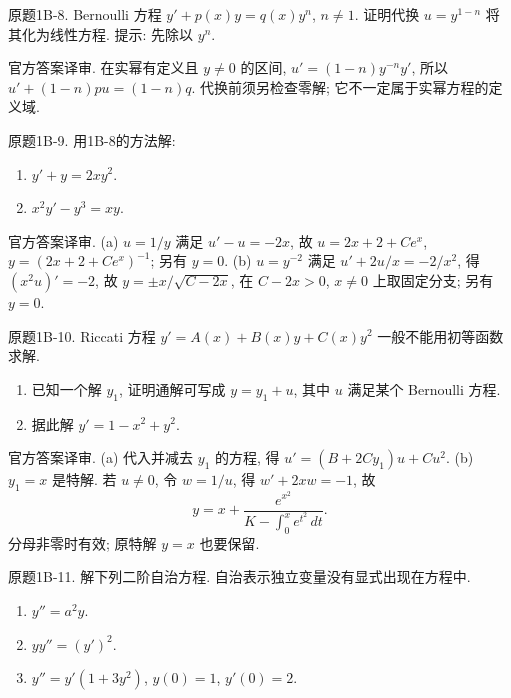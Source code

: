 \begin{exercise}\label{cw:bank-1B-8}
原题1B-8. Bernoulli 方程 $y'+p(x)y=q(x)y^n$, $n\ne1$. 证明代换 $u=y^{1-n}$ 将其化为线性方程. 提示: 先除以 $y^n$.
\end{exercise}
\begin{solution}
官方答案译审. 在实幂有定义且 $y\ne0$ 的区间, $u'=(1-n)y^{-n}y'$, 所以 $u'+(1-n)pu=(1-n)q$. 代换前须另检查零解; 它不一定属于实幂方程的定义域.
\end{solution}
\begin{exercise}\label{cw:bank-1B-9}
原题1B-9. 用1B-8的方法解:
\begin{enumerate}[label=\alph*)]
\item $y'+y=2xy^2$. \item $x^2y'-y^3=xy$.
\end{enumerate}
\end{exercise}
\begin{solution}
官方答案译审. (a) $u=1/y$ 满足 $u'-u=-2x$, 故 $u=2x+2+Ce^x$, $y=(2x+2+Ce^x)^{-1}$; 另有 $y=0$. (b) $u=y^{-2}$ 满足 $u'+2u/x=-2/x^2$, 得 $(x^2u)'=-2$, 故 $y=\pm x/\sqrt{C-2x}$, 在 $C-2x>0$, $x\ne0$ 上取固定分支; 另有 $y=0$.
\end{solution}
\begin{exercise}\label{cw:bank-1B-10}
原题1B-10. Riccati 方程 $y'=A(x)+B(x)y+C(x)y^2$ 一般不能用初等函数求解.
\begin{enumerate}[label=\alph*)]
\item 已知一个解 $y_1$, 证明通解可写成 $y=y_1+u$, 其中 $u$ 满足某个 Bernoulli 方程.
\item 据此解 $y'=1-x^2+y^2$.
\end{enumerate}
\end{exercise}
\begin{solution}
官方答案译审. (a) 代入并减去 $y_1$ 的方程, 得 $u'=(B+2Cy_1)u+Cu^2$. (b) $y_1=x$ 是特解. 若 $u\ne0$, 令 $w=1/u$, 得 $w'+2xw=-1$, 故
\[
 y=x+\frac{e^{x^2}}{K-\int_0^x e^{t^2}\,dt}.
\]
分母非零时有效; 原特解 $y=x$ 也要保留.
\end{solution}
\begin{exercise}\label{cw:bank-1B-11}
原题1B-11. 解下列二阶自治方程. 自治表示独立变量没有显式出现在方程中.
\begin{enumerate}[label=\alph*)]
\item $y''=a^2y$. \item $yy''=(y')^2$. \item $y''=y'(1+3y^2)$, $y(0)=1$, $y'(0)=2$.
\end{enumerate}
\end{exercise}
